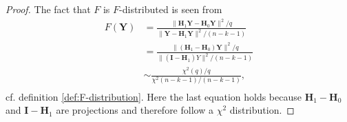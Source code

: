 \begin{proof}
    The fact that $F$ is $F$-distributed is seen from
    \begin{align*}
        F(\textbf{Y}) &= \frac{\| \textbf{H}_1 \textbf{Y} - \textbf{H}_0 \textbf{Y} \|^2/q}{\| \textbf{Y} - \textbf{H}_1 \textbf{Y} \|^2/(n-k-1)} \\
        &= \frac{\| (\textbf{H}_1 - \textbf{H}_0) \textbf{Y} \|^2/q}{\| (\textbf{I} - \textbf{H}_1) Y \|^2/(n-k-1)} \\
        &\sim \frac{\chi^2(q)/q}{\chi^2(n-k-1)/(n-k-1)}, \\
    \end{align*}
    cf. definition \ref{def:F-distribution}. Here the last equation holds because $\textbf{H}_1 - \textbf{H}_0$ and $\textbf{I} - \textbf{H}_1$ are projections and therefore follow a $\chi^2$ distribution.
\end{proof}

